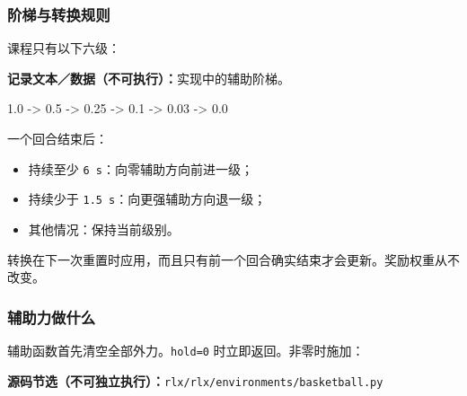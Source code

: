 \documentclass[
  chinese,
  11pt,
  letterpaper,
]{article}
\newenvironment{Shaded}{\begin{snugshade}}{\end{snugshade}}
\newcommand{\NormalTok}[1]{#1}
\providecommand{\tightlist}{%
  \setlength{\itemsep}{0pt}\setlength{\parskip}{0pt}}
\renewenvironment{Shaded}{\par\smallskip}{\par\smallskip}
\begin{document}
\subsubsection{阶梯与转换规则}\label{ux9636ux68afux4e0eux8f6cux6362ux89c4ux5219}

课程只有以下六级：

\textbf{记录文本／数据（不可执行）：}实现中的辅助阶梯。

\begin{Shaded}
\begin{Highlighting}[]
\NormalTok{1.0 {-}\textgreater{} 0.5 {-}\textgreater{} 0.25 {-}\textgreater{} 0.1 {-}\textgreater{} 0.03 {-}\textgreater{} 0.0}
\end{Highlighting}
\end{Shaded}

一个回合结束后：

\begin{itemize}
\tightlist
\item
  持续至少 \texttt{6\ s}：向零辅助方向前进一级；
\item
  持续少于 \texttt{1.5\ s}：向更强辅助方向退一级；
\item
  其他情况：保持当前级别。
\end{itemize}

转换在下一次重置时应用，而且只有前一个回合确实结束才会更新。奖励权重从不改变。

\subsubsection{辅助力做什么}\label{ux8f85ux52a9ux529bux505aux4ec0ux4e48}

辅助函数首先清空全部外力。\texttt{hold=0} 时立即返回。非零时施加：

\textbf{源码节选（不可独立执行）：}\texttt{rlx/\allowbreak{}rlx/\allowbreak{}environm\allowbreak{}ents/\allowbreak{}basketba\allowbreak{}ll.py}
\end{document}
